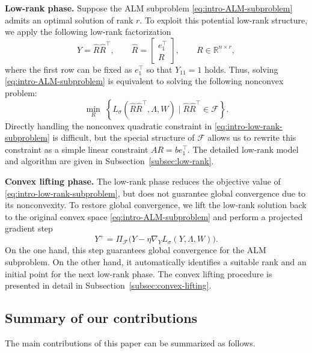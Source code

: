 \documentclass[11pt]{article}
\def\F{\mathcal{F}}
\def\R{\mathbb{R}}
\def\tb#1{\textbf{#1}}
\theoremstyle{plain}
\begin{document}
\medskip
\noindent\tb{Low-rank phase.}
Suppose the ALM subproblem \eqref{eq:intro-ALM-subproblem} admits an optimal solution of
rank $r$. To exploit this potential low-rank structure, we apply the following low-rank factorization
\[
Y=\widehat R\widehat R^\top,
\qquad
\widehat R=\begin{bmatrix}e_1^\top\\ R\end{bmatrix},
\qquad
R\in\R^{n\times r},
\]
where the first row can be fixed as $e_1^\top$ so that $Y_{11}=1$ holds. 
Thus, solving \eqref{eq:intro-ALM-subproblem} is equivalent to solving the following nonconvex problem:
\begin{equation}\label{eq:intro-low-rank-subproblem}
\min_{R}\;\left\{ L_\sigma(\widehat R\widehat R^\top
,\Lambda,W)\mid \widehat R\widehat R^\top\in \F \right\}.
\end{equation}
Directly handling the nonconvex quadratic constraint in \eqref{eq:intro-low-rank-subproblem} is difficult, but the special structure of $\F$ allows us to rewrite this constraint as a simple linear constraint $AR=be_1^\top$. The detailed low-rank model and algorithm are given in Subsection~\ref{subsec:low-rank}.

\medskip
\noindent\tb{Convex lifting phase.}
The low-rank phase reduces the objective value of \eqref{eq:intro-low-rank-subproblem}, but does not guarantee global convergence due to its nonconvexity. To restore global convergence, we lift the low-rank solution back to the original convex space \eqref{eq:intro-ALM-subproblem} and perform a projected gradient step
\[
Y^+=\Pi_{\F}\bigl(Y-\eta\nabla_Y L_\sigma(Y,\Lambda,W)\bigr).
\]
On the one hand, this step guarantees global convergence for the ALM subproblem. On the other hand, it automatically identifies a suitable rank and an initial point for the next low-rank phase. The convex lifting procedure is presented in detail in Subsection~\ref{subsec:convex-lifting}.


\subsection{Summary of our contributions}

The main contributions of this paper can be summarized as follows.
\end{document}
